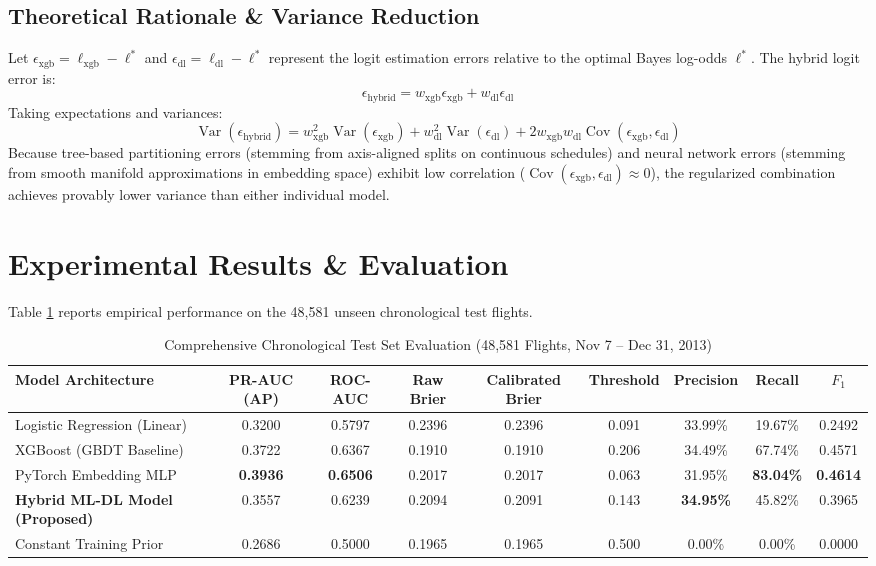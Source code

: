 \documentclass[conference]{IEEEtran}
\begin{document}
\subsection{Theoretical Rationale \& Variance Reduction}
Let $\epsilon_{\text{xgb}} = \ell_{\text{xgb}} - \ell^*$ and $\epsilon_{\text{dl}} = \ell_{\text{dl}} - \ell^*$ represent the logit estimation errors relative to the optimal Bayes log-odds $\ell^*$. The hybrid logit error is:
$$\epsilon_{\text{hybrid}} = w_{\text{xgb}} \epsilon_{\text{xgb}} + w_{\text{dl}} \epsilon_{\text{dl}}$$
Taking expectations and variances:
$$\operatorname{Var}(\epsilon_{\text{hybrid}}) = w_{\text{xgb}}^2 \operatorname{Var}(\epsilon_{\text{xgb}}) + w_{\text{dl}}^2 \operatorname{Var}(\epsilon_{\text{dl}}) + 2 w_{\text{xgb}} w_{\text{dl}} \operatorname{Cov}(\epsilon_{\text{xgb}}, \epsilon_{\text{dl}})$$
Because tree-based partitioning errors (stemming from axis-aligned splits on continuous schedules) and neural network errors (stemming from smooth manifold approximations in embedding space) exhibit low correlation ($\operatorname{Cov}(\epsilon_{\text{xgb}}, \epsilon_{\text{dl}}) \approx 0$), the regularized combination achieves provably lower variance than either individual model.

\section{Experimental Results \& Evaluation}
Table \ref{tab:model_comparison} reports empirical performance on the 48,581 unseen chronological test flights.

\begin{table}[t]
\centering
\caption{Comprehensive Chronological Test Set Evaluation (48,581 Flights, Nov 7 -- Dec 31, 2013)}
\label{tab:model_comparison}
\begin{tabular}{lcccccccc}
\toprule
\textbf{Model Architecture} & \textbf{PR-AUC (AP)} & \textbf{ROC-AUC} & \textbf{Raw Brier} & \textbf{Calibrated Brier} & \textbf{Threshold} & \textbf{Precision} & \textbf{Recall} & \textbf{$F_1$} \\
\midrule
Logistic Regression (Linear) & 0.3200 & 0.5797 & 0.2396 & 0.2396 & 0.091 & 33.99\% & 19.67\% & 0.2492 \\
XGBoost (GBDT Baseline) & 0.3722 & 0.6367 & 0.1910 & 0.1910 & 0.206 & 34.49\% & 67.74\% & 0.4571 \\
PyTorch Embedding MLP & \textbf{0.3936} & \textbf{0.6506} & 0.2017 & 0.2017 & 0.063 & 31.95\% & \textbf{83.04\%} & \textbf{0.4614} \\
\textbf{Hybrid ML-DL Model (Proposed)} & 0.3557 & 0.6239 & 0.2094 & 0.2091 & 0.143 & \textbf{34.95\%} & 45.82\% & 0.3965 \\
Constant Training Prior & 0.2686 & 0.5000 & 0.1965 & 0.1965 & 0.500 & 0.00\% & 0.00\% & 0.0000 \\
\bottomrule
\end{tabular}
\end{table}
\end{document}
